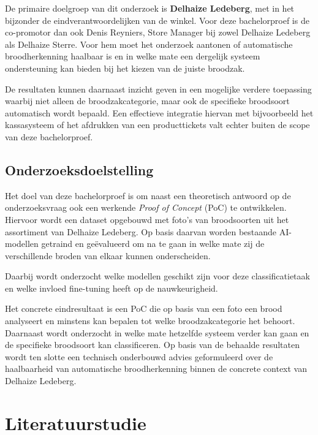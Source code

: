 De primaire doelgroep van dit onderzoek is \textbf{Delhaize Ledeberg}, met in het bijzonder de eindverantwoordelijken van de winkel. Voor deze bachelorproef is de co-promotor dan ook Denis Reyniers, Store Manager bij zowel Delhaize Ledeberg als Delhaize Sterre. Voor hem moet het onderzoek aantonen of automatische broodherkenning haalbaar is en in welke mate een dergelijk systeem ondersteuning kan bieden bij het kiezen van de juiste broodzak.

De resultaten kunnen daarnaast inzicht geven in een mogelijke verdere toepassing waarbij niet alleen de broodzakcategorie, maar ook de specifieke broodsoort automatisch wordt bepaald. Een effectieve integratie hiervan met bijvoorbeeld het kassasysteem of het afdrukken van een producttickets valt echter buiten de scope van deze bachelorproef.

\subsection{Onderzoeksdoelstelling}

Het doel van deze bachelorproef is om naast een theoretisch antwoord op de onderzoeksvraag ook een werkende \textit{Proof of Concept} (PoC) te ontwikkelen. Hiervoor wordt een dataset opgebouwd met foto's van broodsoorten uit het assortiment van Delhaize Ledeberg. Op basis daarvan worden bestaande AI-modellen getraind en geëvalueerd om na te gaan in welke mate zij de verschillende broden van elkaar kunnen onderscheiden.

Daarbij wordt onderzocht welke modellen geschikt zijn voor deze classificatietaak en welke invloed fine-tuning heeft op de nauwkeurigheid.

Het concrete eindresultaat is een PoC die op basis van een foto een brood analyseert en minstens kan bepalen tot welke broodzakcategorie het behoort. Daarnaast wordt onderzocht in welke mate hetzelfde systeem verder kan gaan en de specifieke broodsoort kan classificeren. Op basis van de behaalde resultaten wordt ten slotte een technisch onderbouwd advies geformuleerd over de haalbaarheid van automatische broodherkenning binnen de concrete context van Delhaize Ledeberg.



\section{Literatuurstudie}
\label{sec:literatuurstudie}

